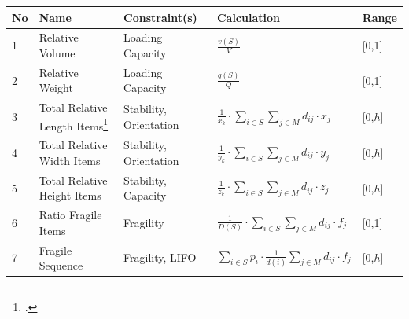 \begin{table}[!h]
    \centering
    \small
    \renewcommand{\arraystretch}{2.0}
    \begin{tabular}{@{}P{0.08\textwidth}P{0.16\textwidth}P{0.26\textwidth}P{0.28\textwidth}@{}P{0.1\textwidth}@{}}
        \toprule
        No & Name                                                                                            & Constraint(s)          & Calculation                                                                                           & Range   \\
          & Relative Volume                                                                                 & Loading Capacity       & $\displaystyle\frac{v(S)}{V}$                                                                         & [0,1]   \\
        2  & Relative Weight                                                                                 & Loading Capacity       & $\displaystyle\frac{q(S)}{Q}$                                                                         & [0,1]   \\
        3  & Total Relative Length Items\footcite[Feature is adapted from][p.21]{sarah_de_wolf_machine_2022} & Stability, Orientation & $\displaystyle\frac{1}{x_k} \cdot \sum_{i \in S}\sum_{j \in M} d_{ij} \cdot x_j$                      & [0,$h$] \\
        4  & Total Relative Width Items \footnotemark[\value{footnote}]                                      & Stability, Orientation & $\displaystyle\frac{1}{y_k} \cdot \sum_{i \in S}\sum_{j \in M} d_{ij} \cdot y_j$                      & [0,$h$] \\
        5  & Total Relative Height Items  \footnotemark[\value{footnote}]                                    & Stability, Capacity    & $\displaystyle\frac{1}{z_k} \cdot \sum_{i \in S}\sum_{j \in M} d_{ij} \cdot z_j$                      & [0,$h$] \\
        6  & Ratio Fragile Items                                                                             & Fragility              & $\displaystyle\frac{1}{D(S)} \cdot \sum_{i \in S}\sum_{j \in M} d_{ij} \cdot f_j$                     & [0,1]   \\
        7  & Fragile Sequence                                                                                & Fragility, \gls{LIFO}  & $\displaystyle\sum_{i \in S}p_i \cdot \frac{1}{d(i)}\sum_{j\in M} d_{ij}\cdot f_j $                   & [0,$h$] \\

\end{tabular}
\end{table}
